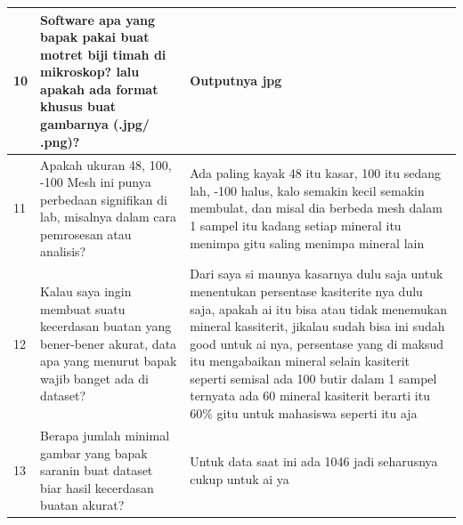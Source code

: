 {\begin{longtable}{|p{}|p{}|p{}|}
10 &
Software apa yang bapak pakai buat motret biji timah di mikroskop? lalu apakah ada format khusus buat gambarnya (.jpg/ .png)? &
Outputnya jpg \\
\hline

11 &
Apakah ukuran 48, 100, -100 Mesh ini punya perbedaan signifikan di lab, misalnya dalam cara pemrosesan atau analisis? &
Ada paling kayak 48 itu kasar, 100 itu sedang lah, -100 halus, kalo semakin kecil semakin membulat, dan misal dia berbeda mesh dalam 1 sampel itu kadang setiap mineral itu menimpa gitu saling menimpa mineral lain \\
\hline

12 &
Kalau saya ingin membuat suatu kecerdasan buatan yang bener-bener akurat, data apa yang menurut bapak wajib banget ada di dataset? &
Dari saya si maunya kasarnya dulu saja untuk menentukan persentase kasiterite nya dulu saja, apakah ai itu bisa atau tidak menemukan mineral kassiterit, jikalau sudah bisa ini sudah good untuk ai nya, persentase yang di maksud itu mengabaikan mineral selain kasiterit seperti semisal ada 100 butir dalam 1 sampel ternyata ada 60 mineral kasiterit berarti itu 60\% gitu untuk mahasiswa seperti itu aja \\
\hline

13 &
Berapa jumlah minimal gambar yang bapak saranin buat dataset biar hasil kecerdasan buatan akurat? &
Untuk data saat ini ada 1046 jadi seharusnya cukup untuk ai ya \\
\hline

\end{longtable}
}


